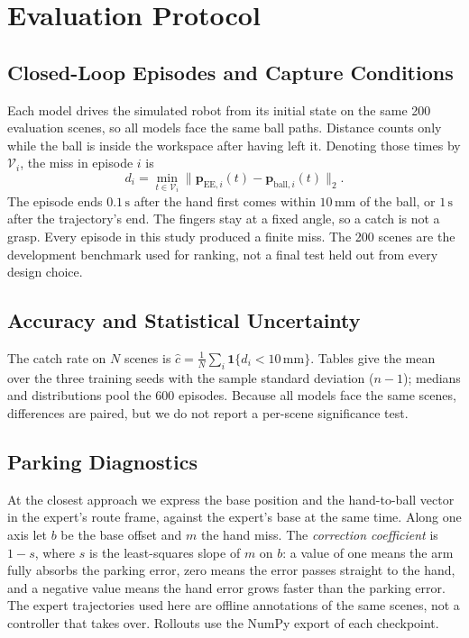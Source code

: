\documentclass[conference]{IEEEtran}
\begin{document}
\section{Evaluation Protocol}
\label{sec:eval}
\subsection{Closed-Loop Episodes and Capture Conditions}
Each model drives the simulated robot from its initial state on the same 200 evaluation scenes, so all models face the same ball paths. Distance counts only while the ball is inside the workspace after having left it. Denoting those times by $\mathcal{V}_i$, the miss in episode $i$ is
\begin{equation}
 d_i=\min_{t\in\mathcal{V}_i}\|\mathbf{p}_{\mathrm{EE},i}(t)-\mathbf{p}_{\mathrm{ball},i}(t)\|_2 .
\end{equation}
The episode ends $0.1\,\mathrm{s}$ after the hand first comes within $10\,\mathrm{mm}$ of the ball, or $1\,\mathrm{s}$ after the trajectory's end. The fingers stay at a fixed angle, so a catch is not a grasp. Every episode in this study produced a finite miss. The 200 scenes are the development benchmark used for ranking, not a final test held out from every design choice.

\subsection{Accuracy and Statistical Uncertainty}
The catch rate on $N$ scenes is $\hat{c}=\frac{1}{N}\sum_{i}\mathbf{1}\{d_i<10\,\mathrm{mm}\}$. Tables give the mean over the three training seeds with the sample standard deviation ($n-1$); medians and distributions pool the 600 episodes. Because all models face the same scenes, differences are paired, but we do not report a per-scene significance test.

\subsection{Parking Diagnostics}
At the closest approach we express the base position and the hand-to-ball vector in the expert's route frame, against the expert's base at the same time. Along one axis let $b$ be the base offset and $m$ the hand miss. The \emph{correction coefficient} is $1-s$, where $s$ is the least-squares slope of $m$ on $b$: a value of one means the arm fully absorbs the parking error, zero means the error passes straight to the hand, and a negative value means the hand error grows faster than the parking error. The expert trajectories used here are offline annotations of the same scenes, not a controller that takes over. Rollouts use the NumPy export of each checkpoint.
\end{document}
